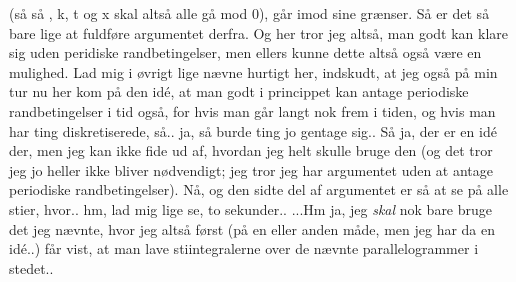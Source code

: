 \documentclass{report}
\begin{document}
(så så \delta\omega, \delta k, \delta t og \delta x skal altså alle gå mod 0), går imod sine grænser. Så er det så bare lige at fuldføre argumentet derfra. Og her tror jeg altså, man godt kan klare sig uden peridiske randbetingelser, men ellers kunne dette altså også være en mulighed. Lad mig i øvrigt lige nævne hurtigt her, indskudt, at jeg også på min tur nu her kom på den idé, at man godt i princippet kan antage periodiske randbetingelser i tid også, for hvis man går langt nok frem i tiden, og hvis man har ting diskretiserede, så.. ja, så burde ting jo gentage sig.. Så ja, der er en idé der, men jeg kan ikke fide ud af, hvordan jeg helt skulle bruge den (og det tror jeg jo heller ikke bliver nødvendigt; jeg tror jeg har argumentet uden at antage periodiske randbetingelser). Nå, og den sidte del af argumentet er så at se på alle stier, hvor.. hm, lad mig lige se, to sekunder.. ...Hm ja, jeg \emph{skal} nok bare bruge det jeg nævnte, hvor jeg altså først (på en eller anden måde, men jeg har da en idé..) får vist, at man lave stiintegralerne over de nævnte parallelogrammer i stedet.. 
\end{document}
